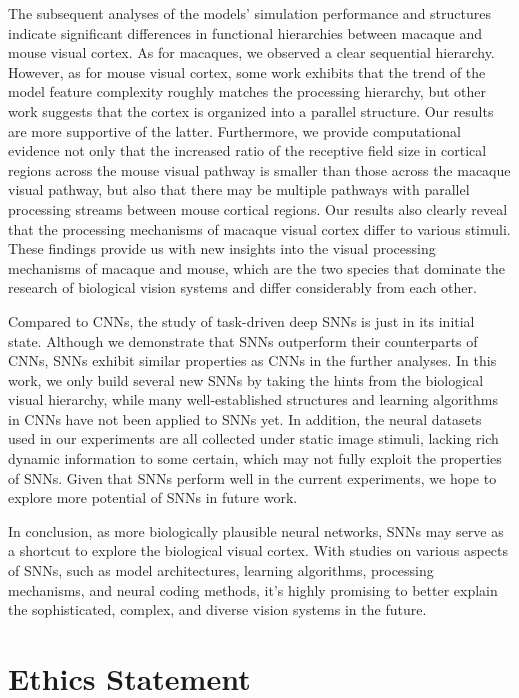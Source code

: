 \documentclass[letterpaper]{article} %
\begin{document}
The subsequent analyses of the models' simulation performance and structures indicate significant differences in functional hierarchies between macaque and mouse visual cortex. As for macaques, we observed a clear sequential hierarchy. However, as for mouse visual cortex, some work \cite{conwell2021neural} exhibits that the trend of the model feature complexity roughly matches the processing hierarchy, but other work suggests that the cortex \cite{shi2019comparison, nayebi2022mouse} is organized into a parallel structure. Our results are more supportive of the latter. Furthermore, we provide computational evidence not only that the increased ratio of the receptive field size in cortical regions across the mouse visual pathway is smaller than those across the macaque visual pathway, but also that there may be multiple pathways with parallel processing streams between mouse cortical regions. Our results also clearly reveal that the processing mechanisms of macaque visual cortex differ to various stimuli. These findings provide us with new insights into the visual processing mechanisms of macaque and mouse, which are the two species that dominate the research of biological vision systems and differ considerably from each other.

Compared to CNNs, the study of task-driven deep SNNs is just in its initial state. Although we demonstrate that SNNs outperform their counterparts of CNNs, SNNs exhibit similar properties as CNNs in the further analyses. In this work, we only build several new SNNs by taking the hints from the biological visual hierarchy, while many well-established structures and learning algorithms in CNNs have not been applied to SNNs yet. In addition, the neural datasets used in our experiments are all collected under static image stimuli, lacking rich dynamic information to some certain, which may not fully exploit the properties of SNNs. Given that SNNs perform well in the current experiments, we hope to explore more potential of SNNs in future work.

In conclusion, as more biologically plausible neural networks, SNNs may serve as a shortcut to explore the biological visual cortex. With studies on various aspects of SNNs, such as model architectures, learning algorithms, processing mechanisms, and neural coding methods, it's highly promising to better explain the sophisticated, complex, and diverse vision systems in the future.

\section{Ethics Statement}
\end{document}
